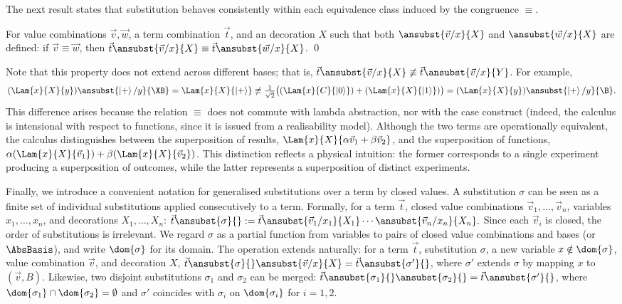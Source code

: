 The next result states that substitution behaves consistently within each
equivalence class induced by the congruence $\equiv$.

\begin{lemma}\label{lem:EquivSubstitutions}
  For value combinations $\vec{v},\vec{w}$, a term combination $\vec{t}$, and
  an decoration $X$ such that both
  $\ansubst{\vec{v}/x}{X}$ and $\ansubst{\vec{w}/x}{X}$ are defined:
  if $\vec{v}\equiv\vec{w}$, then
  $\vec{t}\ansubst{\vec{v}/x}{X}
  \equiv\vec{t}\ansubst{\vec{w}/x}{X}$.
  \qed
\end{lemma}

Note that this property does not extend across different bases; that is,
$\vec{t}\ansubst{\vec{v}/x}{X} \not\equiv\vec{t}\ansubst{\vec{v}/x}{Y}$.
For example,
\[
  (\Lam{x}{X}{y})\ansubst{\ket{+}/y}{\XB}
  = \Lam{x}{X}{\ket{+}} 
  \not\equiv
  \tfrac{1}{\sqrt{2}}\big((\Lam{x}{C}{\ket{0}})
  + (\Lam{x}{X}{\ket{1}})\big)
  = (\Lam{x}{X}{y})\ansubst{\ket{+}/y}{\B}.
\]
This difference arises because the relation $\equiv$ does not commute with
lambda abstraction, nor with the case construct (indeed, the calculus is
intensional with respect to functions, since it is issued from a realisability
model).  Although the two terms are operationally equivalent, the calculus
distinguishes between the superposition of results, $\Lam{x}{X}{\alpha\vec{v}_{1}
+ \beta\vec{v}_{2}}$, and the superposition of functions,
$\alpha(\Lam{x}{X}{\vec{v}_{1}}) + \beta(\Lam{x}{X}{\vec{v}_{2}})$. 
This distinction reflects a physical intuition: the former corresponds to a
single experiment producing a superposition of outcomes, while the latter
represents a superposition of distinct experiments.

Finally, we introduce a convenient notation for generalised substitutions over
a term by closed values. A substitution $\sigma$ can be seen as a finite set of
individual substitutions applied consecutively to a term. Formally, for a term
$\vec{t}$, closed value combinations $\vec{v}_{1},\dots,\vec{v}_{n}$, variables
$x_1,\dots,x_n$, and decorations $X_1,\dots,X_n$:
\(
  \vec{t}\ansubst{\sigma}{}
  := \vec{t}\ansubst{\vec{v}_{1}/x_1}{X_1}\dotsb\ansubst{\vec{v}_{n}/x_n}{X_n}.
\)
Since each $\vec{v}_{i}$ is closed, the order of substitutions is irrelevant. We
regard $\sigma$ as a partial function from variables to pairs of closed value
combinations and bases (or $\AbsBasis$), and write $\dom{\sigma}$ for its domain.
The operation extends naturally: for a term $\vec{t}$, substitution $\sigma$,
a new variable $x\notin\dom{\sigma}$, value combination $\vec{v}$, and decoration $X$,
\(
  \vec{t}\ansubst{\sigma}{}\ansubst{\vec{v}/x}{X}
  = \vec{t}\ansubst{\sigma'}{}
\),
where $\sigma'$ extends $\sigma$ by mapping $x$ to $(\vec v,B)$. Likewise, two
disjoint substitutions $\sigma_1$ and $\sigma_2$ can be merged:
\(
  \vec{t}\ansubst{\sigma_1}{}\ansubst{\sigma_2}{}
  = \vec{t}\ansubst{\sigma'}{}
\),
where $\dom{\sigma_1}\cap\dom{\sigma_2}=\emptyset$ and $\sigma'$ coincides with
$\sigma_i$ on $\dom{\sigma_i}$ for $i=1,2$.
